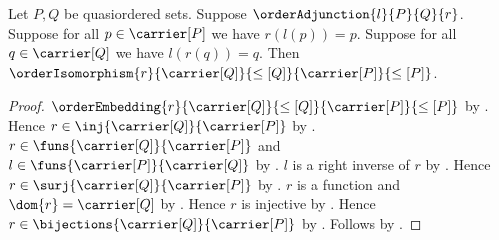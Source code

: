 \begin{proposition}\label{order_adjunction_order_isomorphism_of_unit_counit_identity}
    Let $P,Q$ be quasiordered sets.
    Suppose $\orderAdjunction{l}{P}{Q}{r}$.
    Suppose for all $p\in\carrier[P]$ we have $r(l(p))=p$.
    Suppose for all $q\in\carrier[Q]$ we have $l(r(q))=q$.
    Then $\orderIsomorphism{r}{\carrier[Q]}{\leq[Q]}
        {\carrier[P]}{\leq[P]}$.
\end{proposition}
\begin{proof}
    $\orderEmbedding{r}{\carrier[Q]}{\leq[Q]}
        {\carrier[P]}{\leq[P]}$ by
        .
    Hence $r\in\inj{\carrier[Q]}{\carrier[P]}$ by
        .
    $r\in\funs{\carrier[Q]}{\carrier[P]}$ and
        $l\in\funs{\carrier[P]}{\carrier[Q]}$ by
        .
    $l$ is a right inverse of $r$ by
        .
    Hence $r\in\surj{\carrier[Q]}{\carrier[P]}$ by
        .
    $r$ is a function and $\dom{r}=\carrier[Q]$ by
        .
    Hence $r$ is injective by .
    Hence $r\in\bijections{\carrier[Q]}{\carrier[P]}$ by
        .
    Follows by .
\end{proof}
